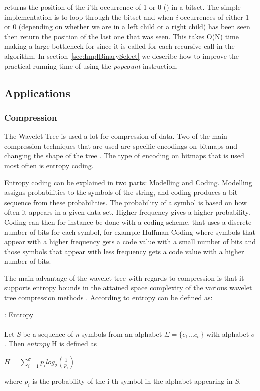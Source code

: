  returns the position of the i'th occurrence of 1 or 0 () in a bitset. 
The simple implementation is to loop through the bitset and when \textit{i} occurrences of either 1 or 0 (depending on whether we are in a left child or a right child) has been seen then return the position of the last one that was seen.
This takes O(N) time making  a large bottleneck for  since it is called for each recursive call in the  algorithm.
In section~\ref{sec:ImplBinarySelect} we describe how to improve the practical running time of  using the \textit{popcount} instruction.

\subsection{Applications}
\subsubsection{Compression}
The Wavelet Tree is used a lot for compression of data. Two of the main compression techniques that are used are specific encodings on bitmaps and changing the shape of the tree \citep[Section~3]{Navjda13}.
The type of encoding on bitmaps that is used most often is entropy coding.

Entropy coding can be explained in two parts: Modelling and Coding.
Modelling assigns probabilities to the symbols of the string, and coding produces a bit sequence from these probabilities.
The probability of a symbol is based on how often it appears in a given data set. 
Higher frequency gives a higher probability.
Coding can then for instance be done with a coding scheme, that uses a discrete number of bits for each symbol, for example Huffman Coding \citep{HuffmanCoding} where symbols that appear with a higher frequency gets a code value with a small number of bits and those symbols that appear with less frequency gets a code value with a higher number of bits.

The main advantage of the wavelet tree with regards to compression is that it supports entropy bounds in the attained space complexity of the various wavelet tree compression methods \citep[Section~2.1]{WTSurvey}.
According to \citep[Section~1]{WTSurvey} entropy can be defined as:

\begin{mdframed}[nobreak, linecolor=lightgray]
\begin{definition}: Entropy \\\\
Let \textit{S} be a sequence of \textit{n} symbols from an alphabet $\Sigma = \lbrace c_1 ... c_\sigma \rbrace$ with alphabet $\sigma$.
Then \textit{entropy} H is defined as
\begin{center}
$H = \sum_{i=1}^{\sigma} p_i log_2(\frac{1}{p_i})$
\end{center}
where $p_i$ is the probability of the i-th symbol in the alphabet appearing in \textit{S}.
\end{definition} 
\end{mdframed}

